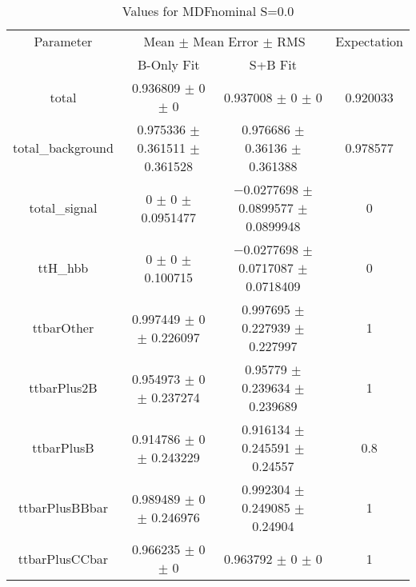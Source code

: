 \begin{table}
\centering
\caption{Values for MDFnominal S=0.0}
\begin{tabular}{cccc}
\toprule
Parameter & \multicolumn{2}{c}{Mean $\pm$ Mean Error $\pm$ RMS} & Expectation\\
 & B-Only Fit & S+B Fit & \\
\midrule
total & \num{0.936809} $\pm$ \num{0} $\pm$ \num{0} & \num{0.937008} $\pm$ \num{0} $\pm$ \num{0} & \num{0.920033}\\
total\_background & \num{0.975336} $\pm$ \num{0.361511} $\pm$ \num{0.361528} & \num{0.976686} $\pm$ \num{0.36136} $\pm$ \num{0.361388} & \num{0.978577}\\
total\_signal & \num{0} $\pm$ \num{0} $\pm$ \num{0.0951477} & \num{-0.0277698} $\pm$ \num{0.0899577} $\pm$ \num{0.0899948} & \num{0}\\
ttH\_hbb & \num{0} $\pm$ \num{0} $\pm$ \num{0.100715} & \num{-0.0277698} $\pm$ \num{0.0717087} $\pm$ \num{0.0718409} & \num{0}\\
ttbarOther & \num{0.997449} $\pm$ \num{0} $\pm$ \num{0.226097} & \num{0.997695} $\pm$ \num{0.227939} $\pm$ \num{0.227997} & \num{1}\\
ttbarPlus2B & \num{0.954973} $\pm$ \num{0} $\pm$ \num{0.237274} & \num{0.95779} $\pm$ \num{0.239634} $\pm$ \num{0.239689} & \num{1}\\
ttbarPlusB & \num{0.914786} $\pm$ \num{0} $\pm$ \num{0.243229} & \num{0.916134} $\pm$ \num{0.245591} $\pm$ \num{0.24557} & \num{0.8}\\
ttbarPlusBBbar & \num{0.989489} $\pm$ \num{0} $\pm$ \num{0.246976} & \num{0.992304} $\pm$ \num{0.249085} $\pm$ \num{0.24904} & \num{1}\\
ttbarPlusCCbar & \num{0.966235} $\pm$ \num{0} $\pm$ \num{0} & \num{0.963792} $\pm$ \num{0} $\pm$ \num{0} & \num{1}\\
\bottomrule
\end{tabular}
\end{table}